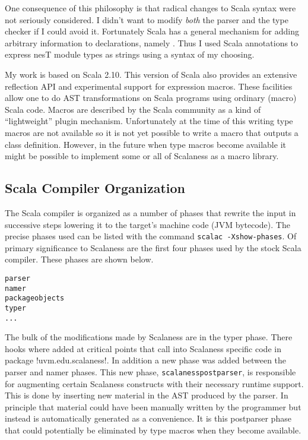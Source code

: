 One consequence of this philosophy is that radical changes to Scala syntax were not seriously
considered. I didn't want to modify \emph{both} the parser and the type checker if I could avoid
it. Fortunately Scala has a general mechanism for adding arbitrary information to declarations,
namely . Thus I used Scala annotations to express nesT module types as
strings using a syntax of my choosing.

My work is based on Scala 2.10. This version of Scala also provides an extensive reflection API
and experimental support for expression macros. These facilities allow one to do AST
transformations on Scala programs using ordinary (macro) Scala code. Macros are described by the
Scala community as a kind of ``lightweight'' plugin mechanism. Unfortunately at the time of this
writing type macros are not available so it is not yet possible to write a macro that outputs a
class definition. However, in the future when type macros become available it might be possible
to implement some or all of Scalaness as a macro library.

\subsection{Scala Compiler Organization}
\label{section-scala-compiler-organization}

The Scala compiler is organized as a number of phases that rewrite the input in successive steps
lowering it to the target's machine code (JVM bytecode). The precise phases used can be listed
with the command \texttt{scalac -Xshow-phases}. Of primary significance to Scalaness are the
first four phases used by the stock Scala compiler. These phases are shown below.

\singlespace
\begin{Verbatim}
parser
namer
packageobjects
typer
...
\end{Verbatim}
\primaryspacing

The bulk of the modifications made by Scalaness are in the typer phase. There hooks where added
at critical points that call into Scalaness specific code in package !uvm.edu.scalaness!. In
addition a new phase was added between the parser and namer phases. This new phase,
\texttt{scalanesspostparser}, is responsible for augmenting certain Scalaness constructs with
their necessary runtime support. This is done by inserting new material in the AST produced by
the parser. In principle that material could have been manually written by the programmer but
instead is automatically generated as a convenience. It is this postparser phase that could
potentially be eliminated by type macros when they become available.

